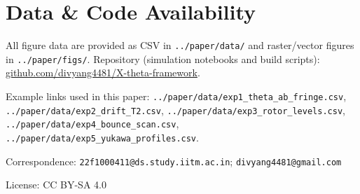 \section*{Data \& Code Availability}
All figure data are provided as CSV in \texttt{../paper/data/} and raster/vector figures in \texttt{../paper/figs/}.  
Repository (simulation notebooks and build scripts): 
\href{https://github.com/divyang4481/X-theta-framework}{github.com/divyang4481/X-theta-framework}.

\noindent Example links used in this paper: 
\texttt{../paper/data/exp1\_theta\_ab\_fringe.csv}, 
\texttt{../paper/data/exp2\_drift\_T2.csv}, 
\texttt{../paper/data/exp3\_rotor\_levels.csv}, 
\texttt{../paper/data/exp4\_bounce\_scan.csv}, 
\texttt{../paper/data/exp5\_yukawa\_profiles.csv}.

\bigskip
\noindent Correspondence: \texttt{22f1000411@ds.study.iitm.ac.in}; \texttt{divyang4481@gmail.com}

\noindent License: CC BY-SA 4.0
